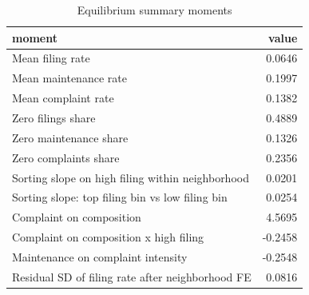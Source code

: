 \begin{table}

\caption{Equilibrium summary moments}
\centering
\begin{tabular}[t]{lr}
\toprule
moment & value\\
\midrule
Mean filing rate & 0.0646\\
Mean maintenance rate & 0.1997\\
Mean complaint rate & 0.1382\\
Zero filings share & 0.4889\\
Zero maintenance share & 0.1326\\
Zero complaints share & 0.2356\\
Sorting slope on high filing within neighborhood & 0.0201\\
Sorting slope: top filing bin vs low filing bin & 0.0254\\
Complaint on composition & 4.5695\\
Complaint on composition x high filing & -0.2458\\
Maintenance on complaint intensity & -0.2548\\
Residual SD of filing rate after neighborhood FE & 0.0816\\
\bottomrule
\end{tabular}
\end{table}
